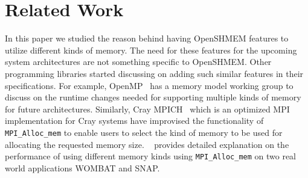 \section{Related Work}
\label{src:relate}
In this paper we studied the reason behind having OpenSHMEM features to
utilize different kinds of memory. The need for these features for the
upcoming system architectures are not something specific to OpenSHMEM.
Other programming libraries started discussing on adding such similar
features in their specifications. For example, OpenMP~\cite{openmp}
has a memory model working group to discuss on the runtime changes
needed for supporting multiple kinds of memory for future architectures.
Similarly, Cray MPICH~\cite{cray-mpich} which is an optimized MPI
implementation for Cray systems have improvised the functionality of
\texttt{MPI\_Alloc\_mem} to enable users to select the kind of memory to
be used for allocating the requested memory size. ~\citeauthor{libfabrics}
provides detailed explanation on the performance of using different
memory kinds using \texttt{MPI\_Alloc\_mem} on two real world applications
WOMBAT and SNAP.
